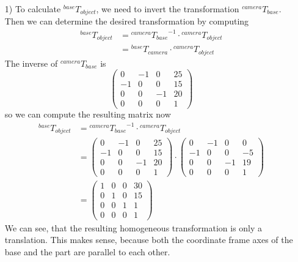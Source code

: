 \documentclass[a4paper,11pt]{article}
\begin{document}
\begin {enumerate}
    \begin{enumerate}
        \item[1)] To calculate ${^{base}T_{object}}$, we need to invert the transformation ${^{camera}T_{base}}$. Then we can determine the desired transformation by computing
        \begin{align*}
          {^{base}T_{object}} &= {^{camera}T_{base}}^{-1} \cdot {^{camera}T_{object}}\\
          &= {^{base}T_{camera}} \cdot {^{camera}T_{object}}
        \end{align*}
        The inverse of ${^{camera}T_{base}}$ is
        $$\begin{pmatrix}
          0 & -1 & 0 & 25\\
          -1 & 0 & 0 & 15\\
          0 & 0 & -1 & 20\\
          0 & 0 & 0 & 1
        \end{pmatrix}$$
        so we can compute the resulting matrix now
        \begin{align*}
          {^{base}T_{object}} &= {^{camera}T_{base}}^{-1} \cdot {^{camera}T_{object}}\\
          &= \begin{pmatrix}
            0 & -1 & 0 & 25\\
            -1 & 0 & 0 & 15\\
            0 & 0 & -1 & 20\\
            0 & 0 & 0 & 1
          \end{pmatrix} \cdot
          \begin{pmatrix}
            0 & -1 & 0 & 0\\
            -1 & 0 & 0 & -5\\
            0 & 0 & -1 & 19\\
            0 & 0 & 0 & 1
          \end{pmatrix}\\
          &= \begin{pmatrix}
            1 & 0 & 0 & 30\\
            0 & 1 & 0 & 15\\
            0 & 0 & 1 & 1\\
            0 & 0 & 0 & 1
          \end{pmatrix}
        \end{align*}
        We can see, that the resulting homogeneous transformation is only a translation. This makes sense, because both the coordinate frame axes of the base and the part are parallel to each other.



\end{enumerate}
\end{enumerate}
\end{document}
